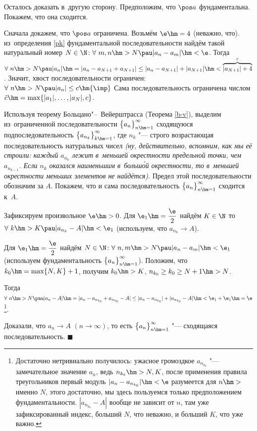 \documentclass[a4paper,10pt,twoside]{article}
\newenvironment{Proof}
       {\par\noindent{\textbf{Доказательство.}}}
       {\hfill$\scriptstyle\blacksquare$}
\begin{document}
\begin{Proof}
    Осталось доказать в~другую сторону. Предположим, что $\pos a$ фундаментальна. Покажем, что она сходится.

    Сначала докажем, что $\pos a$ ограничена. Возьмём $\e\hm=4$ (неважно, что). из~определения \ref{pk} фундаментальной последовательности найдём
    такой натуральный номер $N\in\N\colon
    \forall\  m,n\hm>N\pau |a_n-a_m|\hm<\e$. Тогда $\forall\  n\hm>N\pau
    |a_n|\hm=|a_n-a_{N+1}+a_{N+1}|\leq|a_n-a_{N+1}|+|a_{N+1}|\hm<\overbrace{|a_{N+1}|+4}^{c}$.
    Значит, хвост последовательности ограничен: $\forall\  n\hm>N\pau |a_n|\leq c\hm{\imp}$ Сама последовательность ограничена
    числом $\tilde c\hm=\max\{|a_1|,\ldots,|a_N|,c\}$.

Используя теорему Больцано"--~Вейерштрасса (Теорема \ref{b-v}), выделим из~ограниченной последовательности $\big\{a_n\big\}_{n\hm=1}^\infty$ сходящуюся
подпоследовательность $\big\{a_{n_k}\big\}_{k\hm=1}^\infty$, где $n_k$ "--- строго возрастающая последовательность натуральных чисел
\textit{(ну, действительно, вспомним, как мы её строили:
каждый $a_{n_k}$ лежит в~меньшей окрестности предельной точки, чем $a_{n_{k-1}}$.
Если $n_k$ оказался наименьшим в~больш\'{о}й окрестности, то в~меньшей окрестности меньших элементов не найдётся)}.
Предел этой последовательности обозначим за $A$. Покажем, что и сама последовательность $\big\{a_n\big\}_{n\hm=1}^\infty$ сходится к~$A$.

Зафиксируем произвольное $\e\hm>0$. Для $\e_1\hm=\dfrac{\e}{2}$ найдём $K\in\N$ то $\forall\  k\hm>K\pau |a_{n_k}-A|\hm<\e_1$
 (используем, что $a_{n_k}\to A$).

Для $\e_1\hm=\dfrac{\e}{2}$ найдём $N\in\N\colon \forall\  n,m\hm>N\pau |a_n-a_m|\hm<\e_1$ (используем фундаментальность $\big\{a_n\big\}_{n\hm=1}^\infty$). Положим, что $k_0\hm=\max\{N,K\}+1$,
получим $k_0\hm>K$, $n_{k_0}\geq k_0\geq N+1\hm>N$.


Тогда $\forall\  n\hm>N\pau |a_n-A|\hm=|a_n-a_{n_{k_0}}+a_{n_{k_0}}-A|\leq|a_n-a_{n_{k_0}}|+|a_{n_{k_0}}-A|\hm<\e_1+\e_1
\hm=\e$\footnote{Достаточно нетривиально получилось: ужасное громоздкое $a_{n_{k_0}}$ "--- замечательное значение $a_n$, ведь $n_{k_0}\hm>N,K$, после применения правила треугольников первый модуль
$|a_n-a_{n_{k_0}}|\hm<\e$ разумеется для $n\hm>$ именно $N$, этого достаточно, мы здесь пользуемся только предположением фундаментальности. $|a_{n_{k_0}}-A|$ вообще не зависит от $n$, там уже зафиксированный индекс, больший $N$, что неважно, и больший $K$, что уже важно.
}.

Доказали, что $a_n\to A$ $(n\to \infty)$, то есть $\big\{a_n\big\}_{n\hm=1}^\infty$ "--- сходящаяся последовательность.
\end{Proof}
\end{document}

